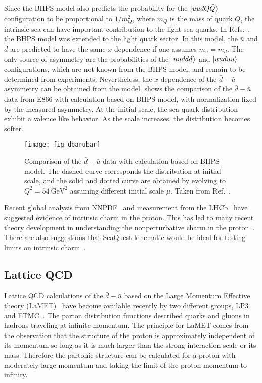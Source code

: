 \documentclass[../main.tex]{subfiles}
\begin{document}
Since the BHPS model also predicts the probability for the $\ket{uudQ\bar{Q}}$ configuration to
be proportional to $1/m^2_Q$, where $m_Q$ is the mass of quark $Q$, the intrinsic sea can have important
contribution to the light sea-quarks. In Refs.~\cite{chang2011,chang2011a}, the BHPS model
was extended to the light quark sector. In this model, the $\bar{u}$ and $\bar{d}$ are predicted
to  have the same $x$ dependence if one assumes $m_u=m_d$. The only source of asymmetry
are the probabilities of the $\ket{uudd\bar{d}}$ and $\ket{uudu\bar{u}}$ configurations,
which are not known from the BHPS model, and remain to be determined from experiments.
Nevertheless, the $x$ dependence of the $\bar{d}-\bar{u}$ asymmetry can be obtained from the model.
 shows the comparison of the $\bar{d}-\bar{u}$ data from E866 with calculation
based on BHPS model, with normalization fixed by the measured asymmetry. At the initial scale,
the sea-quark distribution exhibit a valence like behavior. As the scale increases, the distribution
becomes softer.
\begin{figure}[hb!]
	\centering
	\texttt{[image: fig\_dbarubar]}
	\caption{Comparison of the $\bar{d}-\bar{u}$ data with calculation based on BHPS model.
		The dashed curve corresponds the distribution at initial scale, and the solid and dotted
		curve are obtained by evolving to $Q^2=\SI{54}{\GeV\squared}$ assuming different initial scale $\mu$.
		Taken from Ref.~\cite{chang2011}. }
	\label{fig:five_quark}
\end{figure}

Recent global analysis from NNPDF~\cite{ball2022} and measurement from the LHCb~\cite{aaij2022}
have suggested evidence of intrinsic charm in the proton. This has led to many recent theory
development in understanding the nonperturbative charm in the proton~\cite{guzzi2023}. There are
also suggestions that SeaQuest kinematic would be ideal for testing limits on intrinsic charm~\cite{vogt2021}.

\subsection{Lattice QCD}
Lattice QCD calculations of the $\bar{d} - \bar{u}$ based on the Large Momentum Effective
theory (LaMET)~\cite{ji2021,constantinou2021} have become available recently by two different groups,
LP3~\cite{chen2018} and ETMC~\cite{alexandrou2018}.
The parton distribution functions described quarks and gluons in hadrons traveling at infinite
momentum. The principle for LaMET comes from the observation that the structure of the proton is
approximately independent of its momentum so long as it is much larger than the strong interaction
scale or its mass. Therefore the partonic structure can be calculated for a proton with
moderately-large momentum and taking the limit of the proton momentum to infinity.
\end{document}
